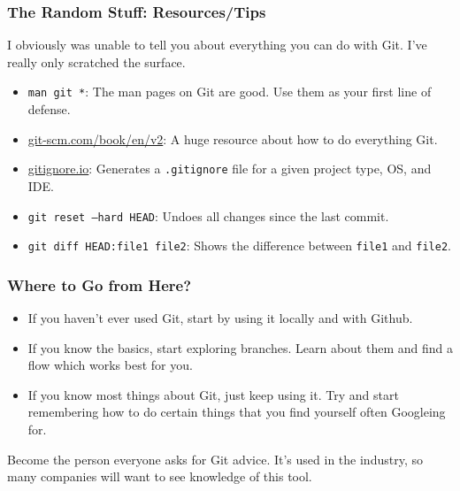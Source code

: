 \documentclass{beeper}
\begin{document}
\begin{frame}
    \frametitle{The Random Stuff: Resources/Tips}

    I obviously was unable to tell you about everything you can do with Git. I've really only
    scratched the surface.

    \begin{itemize}
        \item \texttt{man git *}: The man pages on Git are good. Use them as your first line of
            defense.
        \item \href{https://git-scm.com/book/en/v2}{git-scm.com/book/en/v2}: A
            huge resource about how to do everything Git.
        \item \href{https://gitignore.io}{gitignore.io}: Generates a
            \texttt{.gitignore} file for a given project type, OS, and IDE.
        \item \texttt{git reset --hard HEAD}: Undoes all changes since the last commit.
        \item \texttt{git diff HEAD:file1 file2}: Shows the difference between \texttt{file1} and
            \texttt{file2}.
    \end{itemize}
\end{frame}

\begin{frame}
    \frametitle{Where to Go from Here?}
    \begin{itemize}[<+->]
        \item If you haven't ever used Git, start by using it locally and with Github.
        \item If you know the basics, start exploring branches. Learn about them and find a flow
            which works best for you.
        \item If you know most things about Git, just keep using it. Try and start remembering how
            to do certain things that you find yourself often Googleing for. 
    \end{itemize}
    Become the person everyone asks for Git advice. It's used in the industry, so many companies
    will want to see knowledge of this tool.
\end{frame}
\end{document}
